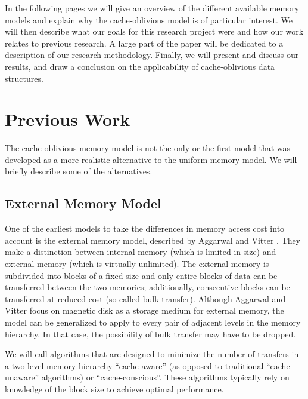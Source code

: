 \documentclass{acm_proc_article-sp}
\begin{document}
In the following pages we will give an overview of the different available memory models and explain why the cache-obliv\-i\-ous mod\-el is of particular interest. We will then describe what our goals for this research project were and how our work relates to previous research.
A large part of the paper will be dedicated to a description of our research methodology. Finally, we will present and discuss our results, and draw a conclusion on the applicability of cache-oblivious data structures.

\section{Previous Work}
The cache-oblivious memory model is not the only or the first mod\-el that was developed as a more realistic alternative to the uniform memory model. We will briefly describe some of the alternatives.

\subsection{External Memory Model}
One of the earliest models to take the differences in memory access cost into account is the external memory model, described by Aggarwal and Vitter \cite{aggarwal1988ioc}. They make a distinction between internal memory (which is limited in size) and external memory (which is virtually unlimited). The external memory is subdivided into blocks of a fixed size and only entire blocks of data can be transferred between the two memories; additionally, consecutive blocks can be transferred at reduced cost (so-called bulk transfer). Although Aggarwal and Vitter focus on magnetic disk as a storage medium for external memory, the model can be generalized to apply to every pair of adjacent levels in the memory hierarchy. In that case, the possibility of bulk transfer may have to be dropped.

We will call algorithms that are designed to minimize the number of transfers in a two-level memory hierarchy ``cache-aware'' (as opposed to traditional ``cache-unaware'' algorithms) or ``cache-conscious''. These algorithms typically rely on knowledge of the block size to achieve optimal performance.
\end{document}
